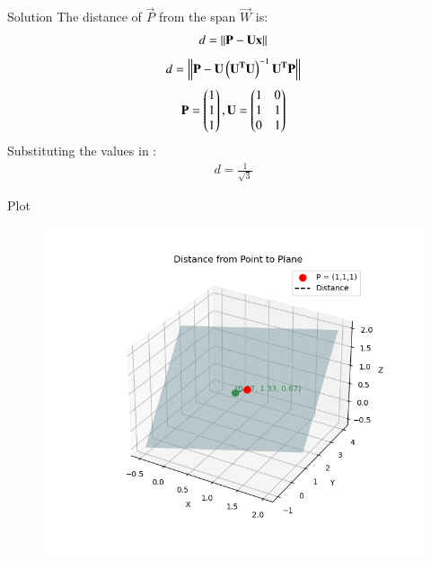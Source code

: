 \documentclass{beamer}
\begin{document}
\begin{frame}{Solution}
The distance of $\vec{P}$ from the span $\vec{W}$ is:
\begin{align}
d = \left\lVert\mathbf{P} - \mathbf{U}\mathbf{x}\right\rVert
\end{align}
\begin{align}
d = \left\lVert\mathbf{P} - \mathbf{U}\left(\mathbf{U^T}\mathbf{U}\right)^{-1} \mathbf{U^T}\mathbf{P}\right\rVert
\end{align}
\begin{align}
\mathbf{P} = \begin{pmatrix}1 \\ 1 \\ 1\end{pmatrix}, \mathbf{U} = \begin{pmatrix}1 & 0 \\ 1 & 1 \\ 0 & 1\end{pmatrix}
\end{align}
Substituting the values in :
\begin{align}
d = \frac{1}{\sqrt{3}}
\end{align}


\end{frame}

\begin{frame}{Plot}
\begin{figure}[H]
    \centering
    \includegraphics[height=0.5\textheight, keepaspectratio]{figs/Figure_1.png}
    \label{figure_1}
\end{figure}
\end{frame}
\end{document}
